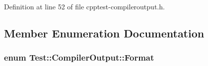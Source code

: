 Definition at line 52 of file cpptest-\/compileroutput.\+h.



\subsection{Member Enumeration Documentation}
\subsubsection[{\texorpdfstring{Format}{Format}}]{\setlength{\rightskip}{0pt plus 5cm}enum {\bf Test\+::\+Compiler\+Output\+::\+Format}}\hypertarget{class_test_1_1_compiler_output_ab34cf506804cefbc67545a256af196ff}{}\label{class_test_1_1_compiler_output_ab34cf506804cefbc67545a256af196ff}
